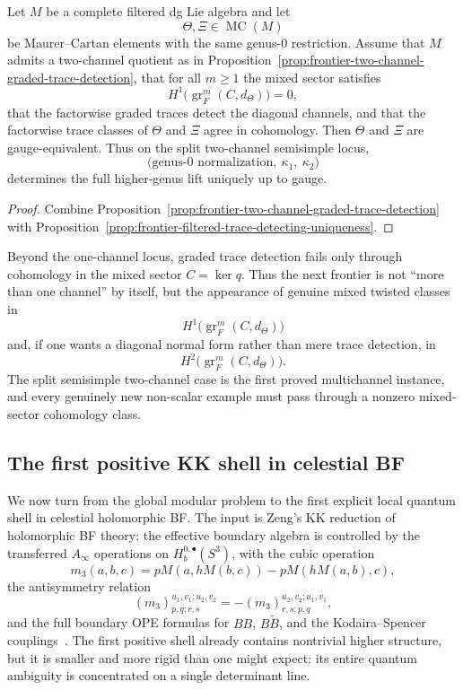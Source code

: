 \begin{corollary}
\label{cor:frontier-two-channel-modular-lift-rigidity}
Let $M$ be a complete filtered dg Lie algebra and let
\[
\Theta,\Xi\in\operatorname{MC}(M)
\]
be Maurer--Cartan elements with the same genus-$0$ restriction.
Assume that $M$ admits a two-channel quotient as in
Proposition~\ref{prop:frontier-two-channel-graded-trace-detection}, that
for all $m\ge 1$ the mixed sector satisfies
\[
H^1\!\bigl(\operatorname{gr}_F^m(C,d_{\Theta})\bigr)=0,
\]
that the factorwise graded traces detect the diagonal channels, and that
the factorwise trace classes of $\Theta$ and $\Xi$ agree in cohomology.
Then $\Theta$ and $\Xi$ are gauge-equivalent.
Thus on the split two-channel semisimple locus,
\[
\bigl(\text{genus-$0$ normalization},\ \kappa_1,\ \kappa_2\bigr)
\]
determines the full higher-genus lift uniquely up to gauge.
\end{corollary}

\begin{proof}
Combine
Proposition~\ref{prop:frontier-two-channel-graded-trace-detection}
with
Proposition~\ref{prop:frontier-filtered-trace-detecting-uniqueness}.
\end{proof}

\begin{remark}
\label{rem:frontier-two-channel-trace-frontier}
Beyond the one-channel locus, graded trace detection fails only through
cohomology in the mixed sector $C=\ker q$.
Thus the next frontier is not ``more than one channel'' by itself, but the
appearance of genuine mixed twisted classes in
\[
H^1\!\bigl(\operatorname{gr}_F^m(C,d_{\Theta})\bigr)
\]
and, if one wants a diagonal normal form rather than mere trace detection,
in
\[
H^2\!\bigl(\operatorname{gr}_F^m(C,d_{\Theta})\bigr).
\]
The split semisimple two-channel case is the first proved multichannel
instance, and every genuinely new non-scalar example must pass through a
nonzero mixed-sector cohomology class.
\end{remark}

\subsection{The first positive KK shell in celestial BF}
\label{subsec:frontier-determinantal-shell}

We now turn from the global modular problem to the first explicit local
quantum shell in celestial holomorphic BF.
The input is Zeng's KK reduction of holomorphic BF theory: the effective
boundary algebra is controlled by the transferred $A_\infty$ operations on
$H_b^{0,\bullet}(S^3)$, with the cubic operation
\[
m_3(a,b,c)=pM(a,hM(b,c))-pM(hM(a,b),c),
\]
the antisymmetry relation
\[
(m_3)_{p,q;r,s}^{u_1,v_1;u_2,v_2}
=
-(m_3)_{r,s;p,q}^{u_2,v_2;u_1,v_1},
\]
and the full boundary OPE formulas for $BB$, $B\widetilde B$, and the
Kodaira--Spencer couplings~\cite{Zeng23}.  The first positive shell already
contains nontrivial higher structure, but it is smaller and more rigid than
one might expect: its entire quantum ambiguity is concentrated on a single
determinant line.

